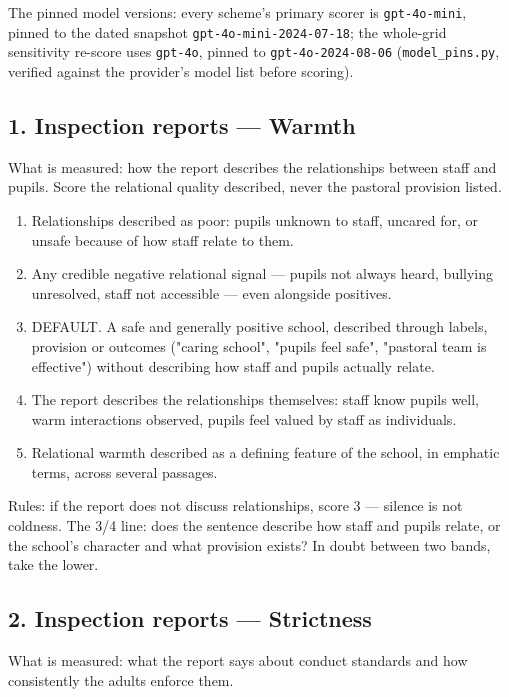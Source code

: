 \noindent The pinned model versions: every scheme's primary scorer is
\texttt{gpt-4o-mini}, pinned to the dated snapshot
\texttt{gpt-4o-mini-2024-07-18}; the whole-grid sensitivity re-score uses
\texttt{gpt-4o}, pinned to \texttt{gpt-4o-2024-08-06}
(\texttt{model\_pins.py}, verified against the provider's model list before
scoring).\medskip

\subsection*{1. Inspection reports --- Warmth}
What is measured: how the report describes the relationships between staff and pupils. Score the relational quality described, never the pastoral provision listed.

\begin{enumerate}
  \item Relationships described as poor: pupils unknown to staff, uncared for, or unsafe because of how staff relate to them.
  \item Any credible negative relational signal --- pupils not always heard, bullying unresolved, staff not accessible --- even alongside positives.
  \item DEFAULT. A safe and generally positive school, described through labels, provision or outcomes ("caring school", "pupils feel safe", "pastoral team is effective") without describing how staff and pupils actually relate.
  \item The report describes the relationships themselves: staff know pupils well, warm interactions observed, pupils feel valued by staff as individuals.
  \item Relational warmth described as a defining feature of the school, in emphatic terms, across several passages.
\end{enumerate}
Rules: if the report does not discuss relationships, score 3 --- silence is not coldness. The 3/4 line: does the sentence describe how staff and pupils relate, or the school's character and what provision exists? In doubt between two bands, take the lower.

\subsection*{2. Inspection reports --- Strictness}
What is measured: what the report says about conduct standards and how consistently the adults enforce them.

